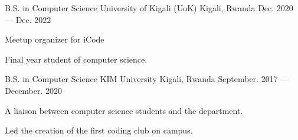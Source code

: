 \begin{cventries}
  \cventry
    {B.S. in Computer Science}
    {University of Kigali (UoK)}
    {Kigali, Rwanda}
    {Dec. 2020 --- Dec. 2022}
    {
      \begin{cvitems}
        \item {Meetup organizer for iCode}
        \item {Final year student of computer science.}
      \end{cvitems}
    }
  \cventry
    {B.S. in Computer Science}
    {KIM University}
    {Kigali, Rwanda}
    {September. 2017 --- December. 2020}
    {
      \begin{cvitems}
        \item {A liaison between computer science students and the department. }
        \item {Led the creation of the first coding club on campus.}
      \end{cvitems}
    }
\end{cventries}
